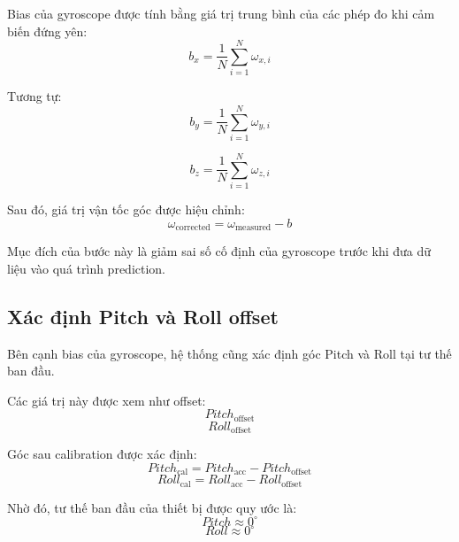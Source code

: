 Bias của gyroscope được tính bằng giá trị trung bình của các phép đo khi cảm biến đứng yên:
\begin{equation}
b_x=
\frac{1}{N}
\sum_{i=1}^{N}
\omega_{x,i}
\end{equation}

Tương tự:
\begin{equation}
b_y=
\frac{1}{N}
\sum_{i=1}^{N}
\omega_{y,i}
\end{equation}

\begin{equation}
b_z=
\frac{1}{N}
\sum_{i=1}^{N}
\omega_{z,i}
\end{equation}

Sau đó, giá trị vận tốc góc được hiệu chỉnh:
\begin{equation}
\omega_{\text{corrected}}
=
\omega_{\text{measured}}
-
b
\end{equation}

Mục đích của bước này là giảm sai số cố định của gyroscope trước khi đưa dữ liệu vào quá trình prediction.


\subsection{Xác định Pitch và Roll offset}

Bên cạnh bias của gyroscope, hệ thống cũng xác định góc Pitch và Roll tại tư thế ban đầu.

Các giá trị này được xem như offset:
\begin{equation}
Pitch_{\text{offset}}
\end{equation}
\begin{equation}
Roll_{\text{offset}}
\end{equation}

Góc sau calibration được xác định:
\begin{equation}
Pitch_{\text{cal}}
=
Pitch_{\text{acc}}
-
Pitch_{\text{offset}}
\end{equation}
\begin{equation}
Roll_{\text{cal}}
=
Roll_{\text{acc}}
-
Roll_{\text{offset}}
\end{equation}

Nhờ đó, tư thế ban đầu của thiết bị được quy ước là:
\begin{equation}
Pitch\approx0^\circ
\end{equation}
\begin{equation}
Roll\approx0^\circ
\end{equation}

